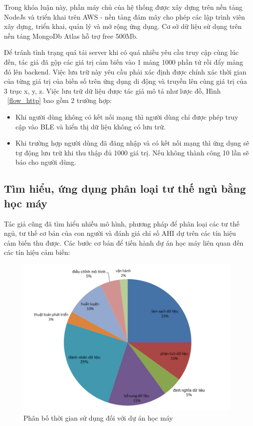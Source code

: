 Trong khóa luận này, phần máy chủ của hệ thống được xây dựng trên nền tảng NodeJs và triển khai trên AWS - nền tảng đám mây cho phép các lập trình viên xây dựng, triển khai, quản lý và mở rộng ứng dụng. Cơ sở dữ liệu sử dụng trên nền tảng MongoDb Atlas hỗ trợ free 500Mb.

Để tránh tình trạng quá tải server khi có quá nhiều yêu cầu truy cập cùng lúc đến, tác giả đã gộp các giá trị cảm biến vào 1 mảng 1000 phần tử rồi đẩy mảng đó lên backend. Việc lưu trữ này yêu cầu phải xác định được chính xác thời gian của từng giá trị của biến số trên ứng dụng di động và truyền lên cùng giá trị của 3 trục x, y, z. Việc lưu trữ dữ liệu được tác giả mô tả như lược đồ, Hình ~\ref{flow_http} bao gồm 2 trường hợp:



\begin{itemize}
    \item Khi người dùng không có kết nối mạng thì người dùng chỉ được phép truy cập vào BLE và hiển thị dữ liệu không có lưu trữ.
    
    \item Khi trường hợp người dùng đã đăng nhập và có kết nối mạng thì ứng dụng sẽ tự động lưu trữ khi thu thập đủ 1000 giá trị. Nếu không thành công 10 lần sẽ báo cho người dùng.
\end{itemize}


\subsection{Tìm hiểu, ứng dụng phân loại tư thế ngủ bằng học máy  }

Tác giả cũng đã tìm hiểu nhiều mô hình, phương pháp để phân loại các tư thế ngủ, tư thế cơ bản của con người và đánh giá chỉ số AHI dự trên các tín hiệu cảm biến thu được. Các bước cơ bản để tiến hành dự án học máy liên quan đến các tín hiệu cảm biến:


\begin{figure}[b!]
		\centering
 		\includegraphics[width=1\textwidth]{images/hocmay_time.png}
		\caption{Phân bố thời gian sử dụng đối với dự án học máy}
		\label{hocmay_time}
\end{figure}

